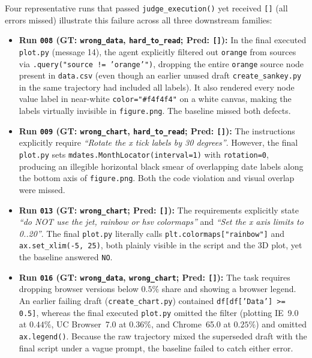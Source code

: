 \documentclass[11pt]{article}
\begin{document}
Four representative runs that passed \texttt{judge\_execution()} yet received \texttt{[]} (all errors missed) illustrate this failure across all three downstream families:
\begin{itemize}
    \item \textbf{Run \texttt{008} (GT: \texttt{wrong\_data}, \texttt{hard\_to\_read}; Pred: \texttt{[]}):} In the final executed \texttt{plot.py} (message 14), the agent explicitly filtered out \texttt{orange} from sources via \texttt{.query("source != 'orange'")}, dropping the entire \texttt{orange} source node present in \texttt{data.csv} (even though an earlier unused draft \texttt{create\_sankey.py} in the same trajectory had included all labels). It also rendered every node value label in near-white \texttt{color="\#f4f4f4"} on a white canvas, making the labels virtually invisible in \texttt{figure.png}. The baseline missed both defects.
    \item \textbf{Run \texttt{009} (GT: \texttt{wrong\_chart}, \texttt{hard\_to\_read}; Pred: \texttt{[]}):} The instructions explicitly require \textit{``Rotate the x tick labels by 30 degrees''}. However, the final \texttt{plot.py} sets \texttt{mdates.MonthLocator(interval=1)} with \texttt{rotation=0}, producing an illegible horizontal black smear of overlapping date labels along the bottom axis of \texttt{figure.png}. Both the code violation and visual overlap were missed.
    \item \textbf{Run \texttt{013} (GT: \texttt{wrong\_chart}; Pred: \texttt{[]}):} The requirements explicitly state \textit{``do NOT use the jet, rainbow or hsv colormaps''} and \textit{``Set the x axis limits to 0..20''}. The final \texttt{plot.py} literally calls \texttt{plt.colormaps["rainbow"]} and \texttt{ax.set\_xlim(-5, 25)}, both plainly visible in the script and the 3D plot, yet the baseline answered \texttt{NO}.
    \item \textbf{Run \texttt{016} (GT: \texttt{wrong\_data}, \texttt{wrong\_chart}; Pred: \texttt{[]}):} The task requires dropping browser versions below $0.5\%$ share and showing a browser legend. An earlier failing draft (\texttt{create\_chart.py}) contained \texttt{df[df['Data'] >= 0.5]}, whereas the final executed \texttt{plot.py} omitted the filter (plotting IE~9.0 at $0.44\%$, UC Browser~7.0 at $0.36\%$, and Chrome~65.0 at $0.25\%$) and omitted \texttt{ax.legend()}. Because the raw trajectory mixed the superseded draft with the final script under a vague prompt, the baseline failed to catch either error.
\end{itemize}
\end{document}
